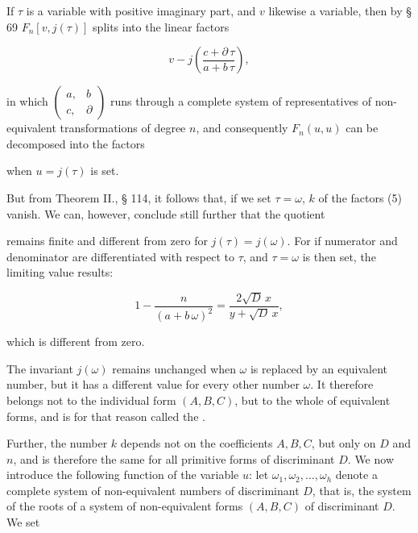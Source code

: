 If $\tau$ is a variable with positive imaginary part, and $v$ likewise a variable, then by § 69 $F_n[v, j(\tau)]$ splits into the linear factors

\[
v - j\left(\frac{c + \partial\,\tau}{a + b\,\tau}\right),
\]

in which $\left(\begin{smallmatrix}a, & b\\ c, & \partial\end{smallmatrix}\right)$ runs through a complete system of representatives of non-equivalent transformations of degree $n$, and consequently $F_n(u, u)$ can be decomposed into the factors


when $u = j(\tau)$ is set.

But from Theorem II., § 114, it follows that, if we set $\tau = \omega$, $k$ of the factors (5) vanish. We can, however, conclude still further that the quotient


remains finite and different from zero for $j(\tau) = j(\omega)$. For if numerator and denominator are differentiated with respect to $\tau$, and $\tau = \omega$ is then set, the limiting value results:

\[
1 - \frac{n}{(a + b\,\omega)^2} = \frac{2\sqrt{D}\,x}{y + \sqrt{D}\,x},
\]

which is different from zero.

The invariant $j(\omega)$ remains unchanged when $\omega$ is replaced by an equivalent number, but it has a different value for every other number $\omega$. It therefore belongs not to the individual form $(A, B, C)$, but to the whole  of equivalent forms, and is for that reason called the .

Further, the number $k$ depends not on the coefficients $A, B, C$, but only on $D$ and $n$, and is therefore the same for all primitive forms of discriminant $D$. We now introduce the following function of the variable $u$: let $\omega_1, \omega_2, \ldots, \omega_h$ denote a complete system of non-equivalent numbers of discriminant $D$, that is, the system of the roots of a system of non-equivalent forms $(A, B, C)$ of discriminant $D$. We set

